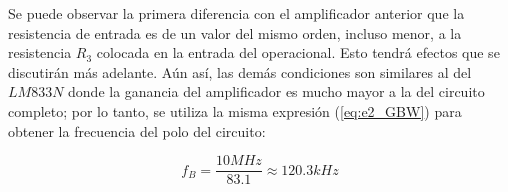 Se puede observar la primera diferencia con el amplificador anterior que la resistencia de entrada es de un valor del mismo orden, incluso menor, a la resistencia $R_3$ colocada en la entrada del operacional. Esto tendrá efectos que se discutirán más adelante.
Aún así, las demás condiciones son similares al del $LM833N$ donde la ganancia del amplificador es mucho mayor a la del circuito completo; por lo tanto, se utiliza la misma expresión (\ref{eq:e2_GBW}) para obtener la frecuencia del polo del circuito:

\begin{equation}
f_B= \frac{10 MHz}{83.1} \approx 120.3 kHz
\label{val:e2_fB_ne}
\end{equation}